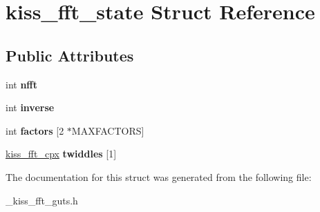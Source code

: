 \hypertarget{structkiss__fft__state}{\section{kiss\-\_\-fft\-\_\-state Struct Reference}
\label{structkiss__fft__state}
}
\subsection*{Public Attributes}
\begin{DoxyCompactItemize}
\item 
\hypertarget{structkiss__fft__state_aa7446bded329a40e13aef0826e349791}{int {\bfseries nfft}}\label{structkiss__fft__state_aa7446bded329a40e13aef0826e349791}

\item 
\hypertarget{structkiss__fft__state_a8faed935610ffb08bf7ad9ea8d6c81d2}{int {\bfseries inverse}}\label{structkiss__fft__state_a8faed935610ffb08bf7ad9ea8d6c81d2}

\item 
\hypertarget{structkiss__fft__state_a2d5d0897276dbac0674fae556f951d18}{int {\bfseries factors} \mbox{[}2 $\ast$M\-A\-X\-F\-A\-C\-T\-O\-R\-S\mbox{]}}\label{structkiss__fft__state_a2d5d0897276dbac0674fae556f951d18}

\item 
\hypertarget{structkiss__fft__state_aa7d1cab86ec03a8ecddfe0d91ef0bd20}{\hyperlink{structkiss__fft__cpx}{kiss\-\_\-fft\-\_\-cpx} {\bfseries twiddles} \mbox{[}1\mbox{]}}\label{structkiss__fft__state_aa7d1cab86ec03a8ecddfe0d91ef0bd20}

\end{DoxyCompactItemize}


The documentation for this struct was generated from the following file\-:\begin{DoxyCompactItemize}
\item 
\-\_\-kiss\-\_\-fft\-\_\-guts.\-h\end{DoxyCompactItemize}
